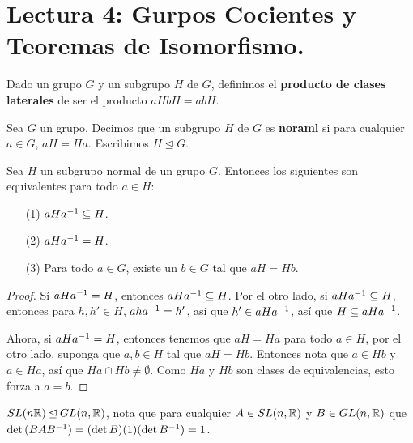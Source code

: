 \section*{Lectura 4: Gurpos Cocientes y Teoremas de Isomorfismo.}

\begin{definition}
    Dado un grupo $G$ y un subgrupo  $H$ de  $G$, definimos el  \textbf{producto
    de clases laterales} de ser el producto $aHbH=abH$.
\end{definition}

\begin{definition}
    Sea $G$ un grupo. Decimos que un subgrupo  $H$ de  $G$ es  \textbf{noraml}
    si para cualquier $a \in G$,  $aH=Ha$. Escribimos $H \unlhd G$.
\end{definition}

\begin{lemma}\label{lemma_4.8}
    Sea $H$ un subgrupo normal de un grupo  $G$. Entonces los siguientes son
    equivalentes para todo $a \in H$:
    \begin{enumerate}
        \item[(1)] $aHa^{-1} \subseteq H$.

        \item[(2)] $aHa^{-1}=H$.

        \item[(3)] Para todo $a \in G$, existe un  $b \in G$ tal que  $aH=Hb$.
    \end{enumerate}
\end{lemma}
\begin{proof}
    S\'i $aHa^{-1}=H$, entonces $aHa^{-1} \subseteq H$. Por el otro lado, si
    $aHa^{-1} \subseteq H$, entonces para $h,h' \in H$,  $aha^{-1}=h'$, as\'i
    que $h' \in aHa^{-1}$, as\'i que $H \subseteq aHa^{-1}$.

    Ahora, si $aHa^{-1}=H$, entonces tenemos que $aH=Ha$ para todo  $a \in H$,
    por el otro lado, suponga que  $a,b \in H$ tal que  $aH=Hb$. Entonces nota
    que  $a \in Hb$ y  $a \in Ha$, as\'i que  $Ha \cap Hb \neq \emptyset$. Como
     $Ha$ y  $Hb$ son clases de equivalencias, esto forza a  $a=b$.
\end{proof}

\begin{example}\label{}
    $SL(n\mathbb{R}) \unlhd GL(n,\mathbb{R})$, nota que para cualquier $A \in SL(n,\mathbb{R})$ y $B \in
    GL(n,\mathbb{R})$ que $\det{(BAB^{-1})}=(\det{B})(1)(\det{B^{-1}})=1$.
\end{example}

